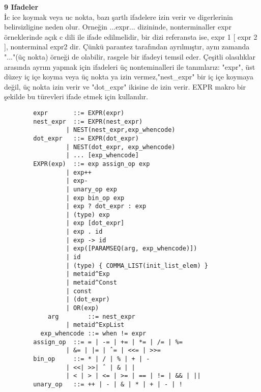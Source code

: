 \documentclass{article}
\begin{document}
\textbf{9 Ifadeler}
\\
İc ice koymak  veya uc nokta, bazı şartlı ifadelere izin verir ve digerlerinin belirsizligine neden olur. Orneğin ...expr... dizininde, nonterminaller expr örneklerinde açık c dili ile ifade edilmelidir, bir dizi referansta ise, expr 1 [ expr 2 ], nonterminal expr2 dir.
Çünkü parantez tarafından ayrılmıştır, aynı zamanda "..."(üç nokta) örneği de olabilir, rasgele bir ifadeyi temsil eder. 
Çeşitli olasılıklar arasında ayrım yapmak için ifadeleri üç nonteminalleri ile tanımlarız: "expr", üst düzey iç içe koyma veya üç nokta ya izin vermez,"nest\_expr" bir iç içe koymaya değil, üç nokta izin verir ve "dot\_expr" ikisine de izin verir. 
EXPR makro bir şekilde bu türevleri ifade etmek için kullanılır.
\begin{lstlisting}
		expr       ::= EXPR(expr)
		nest_expr  ::= EXPR(nest_expr)
			     | NEST(nest_expr,exp_whencode)
		dot_expr   ::= EXPR(dot_expr)
			     | NEST(dot_expr, exp_whencode)
			     | ... [exp_whencode]
		EXPR(exp)  ::= exp assign_op exp
			     | exp++
			     | exp-
			     | unary_op exp
			     | exp bin_op exp
			     | exp ? dot_expr : exp
			     | (type) exp
			     | exp [dot_expr]
			     | exp . id
			     | exp -> id
			     | exp([PARAMSEQ(arg, exp_whencode)])
			     | id
			     | (type) { COMMA_LIST(init_list_elem) }
			     | metaid^Exp
			     | metaid^Const
			     | const
			     | (dot_expr)
			     | OR(exp)
	        arg        ::= nest_expr
			     | metaid^ExpList
	      exp_whencode ::= when != expr
		assign_op  ::= = | -= | += | *= | /= | %=
			     | &= | |= | ˆ= | <<= | >>=
		bin_op     ::= * | / | % | + | -
			     | <<| >>| ˆ | & | |
			     | < | > | <= | >= | == | != | && | ||
		unary_op   ::= ++ | - | & | * | + | - | !
\end{lstlisting}
\end{document}
